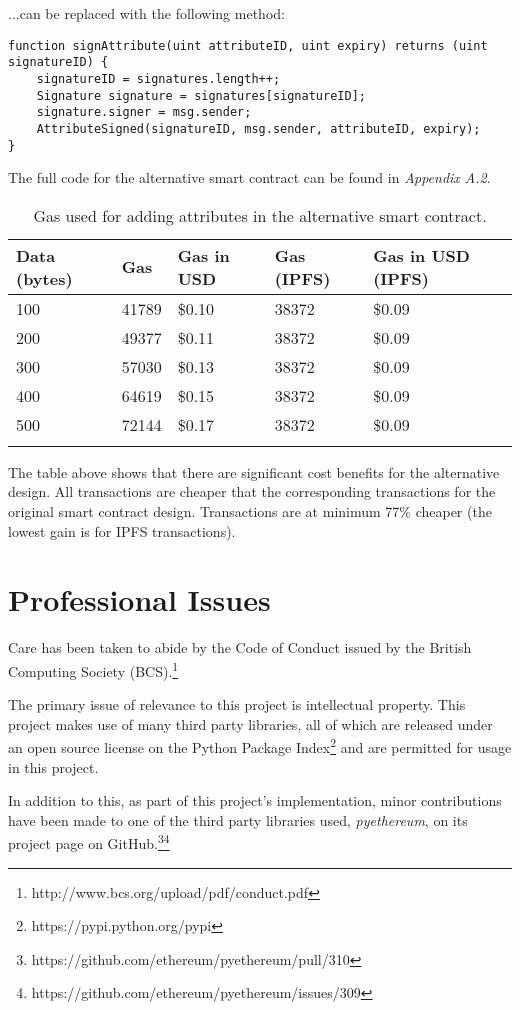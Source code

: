 \documentclass[12pt]{report}
\begin{document}
	...can be replaced with the following method:
	\begin{lstlisting}
function signAttribute(uint attributeID, uint expiry) returns (uint signatureID) {
    signatureID = signatures.length++;
    Signature signature = signatures[signatureID];
    signature.signer = msg.sender;
    AttributeSigned(signatureID, msg.sender, attributeID, expiry);
}
	\end{lstlisting}
	
	The full code for the alternative smart contract can be found in \textit{Appendix A.2}.
	
	\begin{longtable}{|p{2.3cm}|p{2.3cm}|p{2.3cm}|p{2.3cm}|p{2.4cm}|}
		\hline
		\textbf{Data (bytes)} & \textbf{Gas} & \textbf{Gas in USD} & \textbf{Gas (IPFS)} & \textbf{Gas in USD (IPFS)} \\ \hline
		100 & 41789 & \$0.10 & 38372 & \$0.09 \\ \hline
		200 & 49377 & \$0.11 & 38372 & \$0.09 \\ \hline
		300 & 57030 & \$0.13 & 38372 & \$0.09 \\ \hline
		400 & 64619 & \$0.15 & 38372 & \$0.09 \\ \hline
		500 & 72144 & \$0.17 & 38372 & \$0.09 \\ \hline
		\caption{Gas used for adding attributes in the alternative smart contract.}
	\end{longtable}
	
	The table above shows that there are significant cost benefits for the alternative design. All transactions are cheaper that the corresponding transactions for the original smart contract design. Transactions are at minimum 77\% cheaper (the lowest gain is for IPFS transactions).
	
	\chapter{Professional Issues}
	Care has been taken to abide by the Code of Conduct issued by the British Computing Society (BCS).\footnote{http://www.bcs.org/upload/pdf/conduct.pdf}
	
	The primary issue of relevance to this project is intellectual property. This project makes use of many third party libraries, all of which are released under an open source license on the Python Package Index\footnote{https://pypi.python.org/pypi} and are permitted for usage in this project.
	
	In addition to this, as part of this project's implementation, minor contributions have been made to one of the third party libraries used, \textit{pyethereum}, on its project page on GitHub.\footnote{https://github.com/ethereum/pyethereum/pull/310}\footnote{https://github.com/ethereum/pyethereum/issues/309}
	
\end{document}

